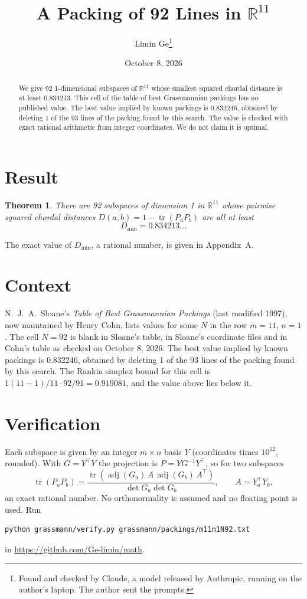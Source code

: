 \documentclass[11pt,a4paper]{article}
\title{A Packing of 92 Lines in $\mathbb{R}^{11}$}
\author{Limin Ge\thanks{Found and checked by Claude, a model released by Anthropic, running on the author's laptop. The author sent the prompts.}}
\date{October 8, 2026}
\newtheorem*{theorem}{Theorem}
\begin{document}
\maketitle
\begin{abstract}
We give 92 1-dimensional subspaces of $\mathbb{R}^{11}$ whose smallest squared chordal distance is at least 0.834213. This cell of the table of best Grassmannian packings has no published value. The best value implied by known packings is 0.832246, obtained by deleting 1 of the 93 lines of the packing found by this search. The value is checked with exact rational arithmetic from integer coordinates. We do not claim it is optimal.
\end{abstract}

\section{Result}
\begin{theorem}
There are 92 subspaces of dimension 1 in $\mathbb{R}^{11}$ whose pairwise squared chordal distances $D(a,b) = 1 - \operatorname{tr}(P_aP_b)$ are all at least
\[ D_{\min} = 0.834213\ldots \]
\end{theorem}
The exact value of $D_{\min}$, a rational number, is given in Appendix~A.


\section{Context}
N.~J.~A.~Sloane's \emph{Table of Best Grassmannian Packings} (last modified 1997), now maintained by Henry Cohn, lists values for some $N$ in the row $m=11$, $n=1$. The cell $N=92$ is blank in Sloane's table, in Sloane's coordinate files and in Cohn's table as checked on October 8, 2026. The best value implied by known packings is 0.832246, obtained by deleting 1 of the 93 lines of the packing found by this search. The Rankin simplex bound for this cell is $1(11-1)/11\cdot 92/91 = 0.919081$, and the value above lies below it.


\section{Verification}
Each subspace is given by an integer $m\times n$ basis $Y$ (coordinates times $10^{12}$, rounded). With $G=Y^\top Y$ the projection is $P=YG^{-1}Y^\top$, so for two subspaces
\[ \operatorname{tr}(P_aP_b)=\frac{\operatorname{tr}(\operatorname{adj}(G_a)\,A\,\operatorname{adj}(G_b)\,A^\top)}{\det G_a\det G_b},\qquad A=Y_a^\top Y_b, \]
an exact rational number. No orthonormality is assumed and no floating point is used. Run
\begin{verbatim}
python grassmann/verify.py grassmann/packings/m11n1N92.txt
\end{verbatim}
in \url{https://github.com/Ge-limin/math}.
\end{document}
